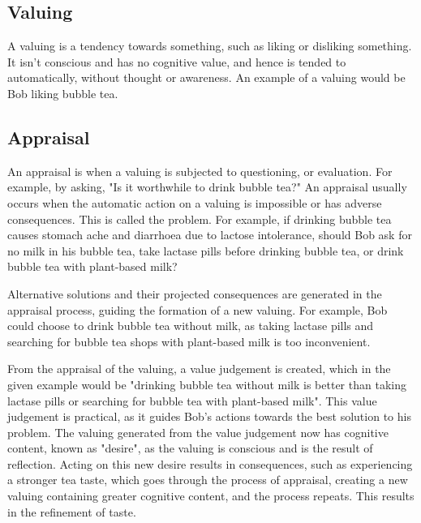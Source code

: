 \documentclass[11pt]{article}
\begin{document}
\subsection{Valuing}
\label{sec:orga3674c9}
A valuing is a tendency towards something,
such as liking or disliking something.
It isn't conscious and has no cognitive value,
and hence is tended to automatically,
without thought or awareness.
An example of a valuing would be Bob liking bubble tea.
\subsection{Appraisal}
\label{sec:orgd90d036}
An appraisal is when a valuing is subjected to questioning, or evaluation.
For example, by asking, "Is it worthwhile to drink bubble tea?"
An appraisal usually occurs when the automatic action on a valuing
is impossible or has adverse consequences.
This is called the problem.
For example, if drinking bubble tea causes stomach ache and diarrhoea
due to lactose intolerance,
should Bob ask for no milk in his bubble tea,
take lactase pills before drinking bubble tea,
or drink bubble tea with plant-based milk?

Alternative solutions and their projected consequences
are generated in the appraisal process,
guiding the formation of a new valuing.
For example, Bob could choose to drink bubble tea without milk,
as taking lactase pills and searching for bubble tea shops
with plant-based milk is too inconvenient.

From the appraisal of the valuing, a value judgement is created,
which in the given example would be "drinking bubble tea without milk
is better than taking lactase pills or searching for bubble tea
with plant-based milk".
This value judgement is practical, as it guides Bob's actions towards
the best solution to his problem.
The valuing generated from the value judgement now has cognitive content,
known as "desire", as the valuing is conscious and is the
result of reflection.
Acting on this new desire results in consequences,
such as experiencing a stronger tea taste,
which goes through the process of appraisal,
creating a new valuing containing greater cognitive content,
and the process repeats.
This results in the refinement of taste.
\end{document}
